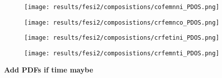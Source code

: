 \begin{figure}[H]
	\texttt{[image: results/fesi2/composistions/cofemnni\_PDOS.png]}
\end{figure}

\begin{figure}[H]
	\texttt{[image: results/fesi2/composistions/crfemnco\_PDOS.png]}
\end{figure}

\begin{figure}[H]
	\texttt{[image: results/fesi2/composistions/crfetini\_PDOS.png]}
\end{figure}

\begin{figure}[H]
	\texttt{[image: results/fesi2/composistions/crfemnti\_PDOS.png]}
\end{figure}


\textbf{Add PDFs if time maybe}